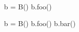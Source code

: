 \documentclass[multi, border=6]{standalone}
\begin{document}
\begin{fixedheightcode}
b = B()
b.foo() 
\end{fixedheightcode}

\begin{fixedheightcode}
b = B()
b.foo() 
b.bar()
\end{fixedheightcode}
\end{document}
